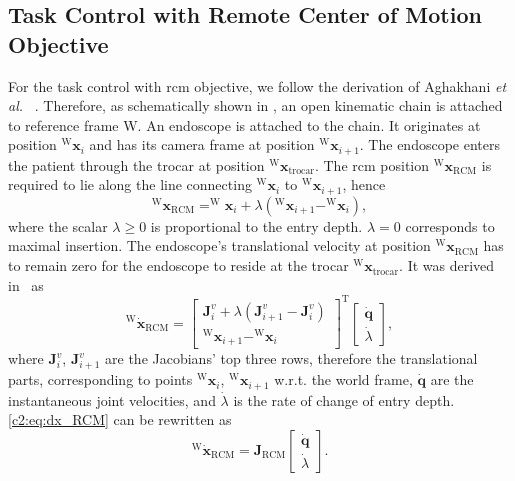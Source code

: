 \subsection{Task Control with Remote Center of Motion Objective}
\label{c2:sec:task_rcm}
For the task control with \acrshort{rcm} objective, we follow the derivation of Aghakhani \emph{et al.} ~\cite{aghakhani2013task}. Therefore, as schematically shown in , an open kinematic chain is attached to reference frame W. An endoscope is attached to the chain. It originates at position $^\text{W}\mathbf{x}_i$ and has its camera frame at position $^\text{W}\mathbf{x}_{i+1}$. The endoscope enters the patient through the trocar at position $^\text{W}\mathbf{x}_\text{trocar}$. The \acrshort{rcm} position $^\text{W}\mathbf{x}_\text{RCM}$ is required to lie along the line connecting $^\text{W}\mathbf{x}_i$ to $^\text{W}\mathbf{x}_{i+1}$, hence
\begin{equation}
^\text{W}\mathbf{x}_\text{RCM} = ^\text{W}\mathbf{x}_i+\lambda\left(^\text{W}\mathbf{x}_{i+1} - ^\text{W}\mathbf{x}_i\right),
\label{c2:eq:lambda}
\end{equation}
where the scalar $\lambda \geq 0$ is proportional to the entry depth. $\lambda = 0$ corresponds to maximal insertion. The endoscope's translational velocity at position $^\text{W}\mathbf{x}_\text{RCM}$ has to remain zero for the endoscope to reside at the trocar $^\text{W}\mathbf{x}_\text{trocar}$. It was derived in~\cite{aghakhani2013task} as
\begin{equation}
    ^\text{W}\dot{\mathbf{x}}_\text{RCM} = \begin{bmatrix}\mathbf{J}^v_i + \lambda(\mathbf{J}^v_{i+1}-\mathbf{J}^v_i)\\ ^\text{W}\mathbf{x}_{i+1} - ^\text{W}\mathbf{x}_i\end{bmatrix}^\text{T}\begin{bmatrix}\dot{\mathbf{q}} \\ \dot{\lambda}\end{bmatrix},
    \label{c2:eq:dx_RCM}
\end{equation}
where $\mathbf{J}^v_i$, $\mathbf{J}^v_{i+1}$ are the Jacobians' top three rows, therefore the translational parts, corresponding to points $^\text{W}\mathbf{x}_i$, $^\text{W}\mathbf{x}_{i+1}$ w.r.t. the world frame, $\dot{\mathbf{q}}$ are the instantaneous joint velocities, and $\dot{\lambda}$ is the rate of change of entry depth. \eqref{c2:eq:dx_RCM} can be rewritten as
\begin{equation}
    ^\text{W}\dot{\mathbf{x}}_\text{RCM} = \mathbf{J}_\text{RCM}\begin{bmatrix}\dot{\mathbf{q}} \\ \dot{\lambda}\end{bmatrix}.
    \label{c2:eq:dx_RCM_short}
\end{equation}
